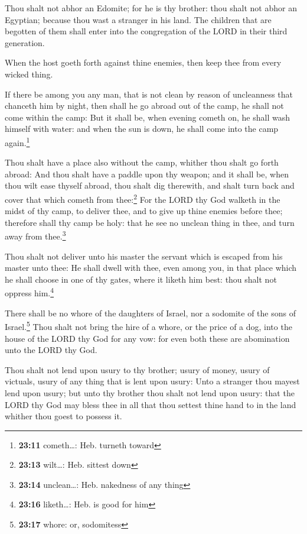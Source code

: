  Thou shalt not abhor an Edomite; for he is thy brother:
thou shalt not abhor an Egyptian; because thou wast a stranger in his
land.  The children that are begotten of them shall enter
into the congregation of the LORD in their third generation.

 When the host goeth forth against thine enemies, then
keep thee from every wicked thing.

 If there be among you any man, that is not clean by
reason of uncleanness that chanceth him by night, then shall he go
abroad out of the camp, he shall not come within the camp:
 But it shall be, when evening cometh on, he shall wash
himself with water: and when the sun is down, he shall come into the
camp again.\footnote{\textbf{23:11} cometh\ldots: Heb. turneth toward}

 Thou shalt have a place also without the camp, whither
thou shalt go forth abroad:  And thou shalt have a paddle
upon thy weapon; and it shall be, when thou wilt ease thyself abroad,
thou shalt dig therewith, and shalt turn back and cover that which
cometh from thee:\footnote{\textbf{23:13} wilt\ldots: Heb. sittest down}
 For the LORD thy God walketh in the midst of thy camp,
to deliver thee, and to give up thine enemies before thee; therefore
shall thy camp be holy: that he see no unclean thing in thee, and turn
away from thee.\footnote{\textbf{23:14} unclean\ldots: Heb. nakedness of
  any thing}

 Thou shalt not deliver unto his master the servant which
is escaped from his master unto thee:  He shall dwell
with thee, even among you, in that place which he shall choose in one of
thy gates, where it liketh him best: thou shalt not oppress
him.\footnote{\textbf{23:16} liketh\ldots: Heb. is good for him}

 There shall be no whore of the daughters of Israel, nor
a sodomite of the sons of Israel.\footnote{\textbf{23:17} whore: or,
  sodomitess}  Thou shalt not bring the hire of a whore,
or the price of a dog, into the house of the LORD thy God for any vow:
for even both these are abomination unto the LORD thy God.

 Thou shalt not lend upon usury to thy brother; usury of
money, usury of victuals, usury of any thing that is lent upon usury:
 Unto a stranger thou mayest lend upon usury; but unto
thy brother thou shalt not lend upon usury: that the LORD thy God may
bless thee in all that thou settest thine hand to in the land whither
thou goest to possess it.

